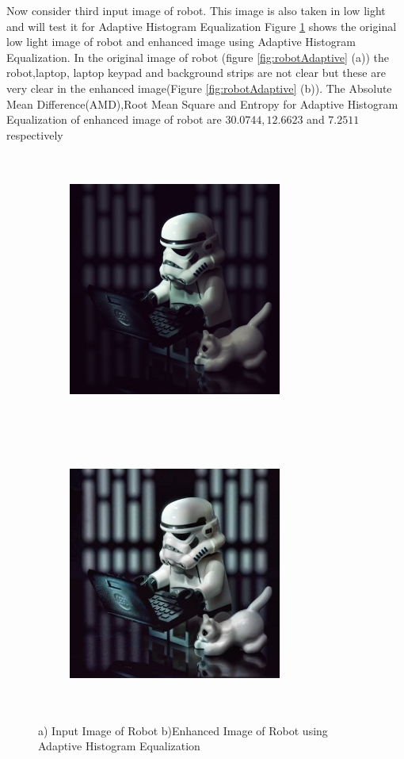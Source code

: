 Now consider third input image of robot. This image is also taken in low light and will test it for Adaptive Histogram Equalization Figure \ref{fig:robotAHE} shows the original low light image of robot and enhanced image using Adaptive Histogram Equalization. In the original image of robot (figure \ref{fig:robotAdaptive} (a))  the robot,laptop, laptop keypad and background strips are not clear but these are very clear in the enhanced image(Figure \ref{fig:robotAdaptive} (b)). The Absolute Mean Difference(AMD),Root Mean Square and Entropy for  Adaptive Histogram Equalization of enhanced image of robot are $30.0744, 12.6623$ and $7.2511$ respectively      



\begin{figure}
	\begin{subfigure}{8cm}
		\centering    
    	\includegraphics[width=7cm,height=9cm,keepaspectratio]{images/ch5/robot_input.jpg}
    	\caption{} 
    \end{subfigure}
  	\begin{subfigure}{6cm}
  		\centering
  		\includegraphics[width=7cm,height=9cm,keepaspectratio]{images/ch5/robot_adapt_hist.jpg}
   		\caption{}
  	\end{subfigure}
  	\caption{a) Input Image of Robot b)Enhanced Image of Robot using Adaptive Histogram Equalization}
  	\label{fig:robotAHE}
\end{figure}


